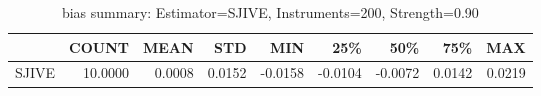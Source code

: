 \begin{table}[ht]
\centering
\caption{bias summary: Estimator=SJIVE, Instruments=200, Strength=0.90}
\begin{tabular}{lrrrrrrrr}
\toprule
 & COUNT & MEAN & STD & MIN & 25\% & 50\% & 75\% & MAX \\
\midrule
SJIVE & 10.0000 & 0.0008 & 0.0152 & -0.0158 & -0.0104 & -0.0072 & 0.0142 & 0.0219 \\
\bottomrule
\end{tabular}
\end{table}
